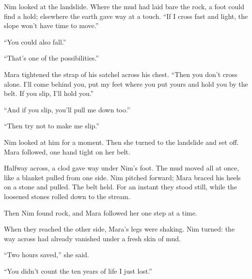 \documentclass[10pt,a4paper]{article}
\begin{document}
Nim looked at the landslide. Where the mud had laid bare the rock, a foot could find a hold; elsewhere the earth gave way at a touch. “If I cross fast and light, the slope won't have time to move.”

“You could also fall.”

“That's one of the possibilities.”

Mara tightened the strap of his satchel across his chest. “Then you don't cross alone. I'll come behind you, put my feet where you put yours and hold you by the belt. If you slip, I'll hold you.”

“And if you slip, you'll pull me down too.”

“Then try not to make me slip.”

Nim looked at him for a moment. Then she turned to the landslide and set off. Mara followed, one hand tight on her belt.

Halfway across, a clod gave way under Nim's foot. The mud moved all at once, like a blanket pulled from one side. Nim pitched forward; Mara braced his heels on a stone and pulled. The belt held. For an instant they stood still, while the loosened stones rolled down to the stream.

Then Nim found rock, and Mara followed her one step at a time.

When they reached the other side, Mara's legs were shaking. Nim turned: the way across had already vanished under a fresh skin of mud.

“Two hours saved,” she said.

“You didn't count the ten years of life I just lost.”
\end{document}
